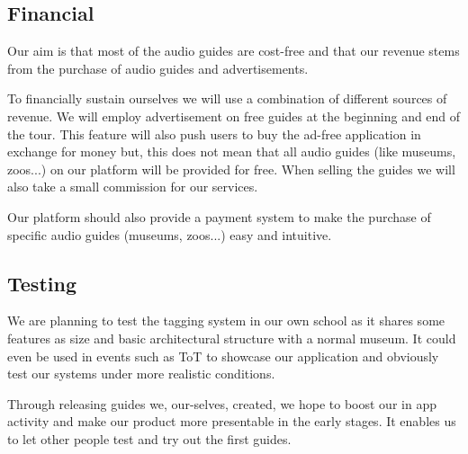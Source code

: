 \documentclass[12pt]{article}
\theoremstyle{definition}
\newenvironment{text}{
}{}
\begin{document}
\subsection{Financial}
\begin{text} 
Our aim is that most of the audio guides are cost-free and that our revenue stems from the purchase of audio guides and advertisements.\newline

To financially sustain ourselves we will use a combination of different sources of revenue. We will employ advertisement on free guides at the beginning and end of the tour. This feature will also push users to buy the ad-free application in exchange for money but, this does not mean that all audio guides (like museums, zoos...) on our platform will be provided for free. When selling the guides we will also take a small commission for our services.\newline

Our platform should also provide a payment system to make the purchase of specific audio guides (museums, zoos...) easy and intuitive. 
\end{text}

\subsection{Testing}
\begin{text}
We are planning to test the tagging system in our own school as it shares some features as size and basic architectural structure with a normal museum. It could even be used in events such as ToT to showcase our application and obviously test our systems under more realistic conditions.\newline

Through releasing guides we, our-selves, created, we hope to boost our in app activity and make our product more presentable in the early stages. It enables us to let other people test and try out the first guides.
\end{text}
 
\pagebreak
\end{document}
